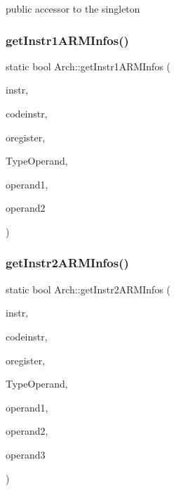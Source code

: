 public accessor to the singleton \mbox{\label{classArch_a3d4760d01a0a07e2d2c063baa991ac43}} 
\subsubsection{\texorpdfstring{get\+Instr1\+A\+R\+M\+Infos()}{getInstr1ARMInfos()}}
{\footnotesize\ttfamily static bool Arch\+::get\+Instr1\+A\+R\+M\+Infos (\begin{DoxyParamCaption}\item[{string \&}]{instr,  }\item[{string \&}]{codeinstr,  }\item[{string \&}]{oregister,  }\item[{\hyperlink{arch_8h_a63b66e201ffc27bbc8f89c8808382044}{offset\+Type} $\ast$}]{Type\+Operand,  }\item[{string \&}]{operand1,  }\item[{string \&}]{operand2 }\end{DoxyParamCaption})\hspace{0.3cm}{\ttfamily [static]}}

\mbox{\label{classArch_a33a111fcd02dc3407328d37a38ad1bf8}} 
\subsubsection{\texorpdfstring{get\+Instr2\+A\+R\+M\+Infos()}{getInstr2ARMInfos()}}
{\footnotesize\ttfamily static bool Arch\+::get\+Instr2\+A\+R\+M\+Infos (\begin{DoxyParamCaption}\item[{string \&}]{instr,  }\item[{string \&}]{codeinstr,  }\item[{string \&}]{oregister,  }\item[{\hyperlink{arch_8h_a63b66e201ffc27bbc8f89c8808382044}{offset\+Type} $\ast$}]{Type\+Operand,  }\item[{string \&}]{operand1,  }\item[{string \&}]{operand2,  }\item[{string \&}]{operand3 }\end{DoxyParamCaption})\hspace{0.3cm}{\ttfamily [static]}}

